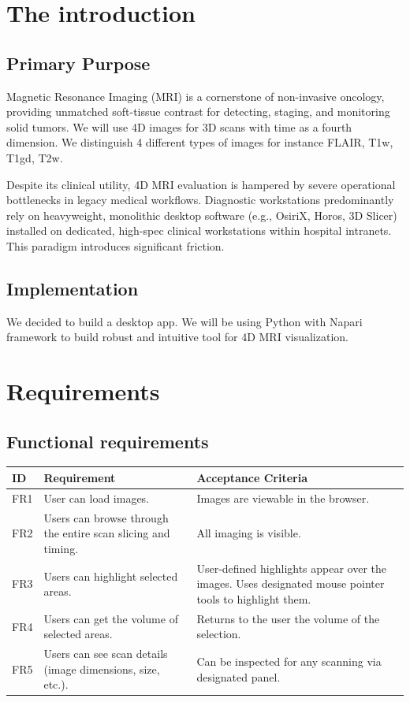 \documentclass[11pt, a4paper]{article}
\begin{document}
\section{The introduction}

\subsection{Primary Purpose}

Magnetic Resonance Imaging (MRI) is a cornerstone of non-invasive oncology, providing unmatched soft-tissue contrast for detecting, staging, and monitoring solid tumors. We will use 4D images for 3D scans with time as a fourth dimension. We distinguish 4 different types of images for instance FLAIR, T1w, T1gd, T2w.

Despite its clinical utility, 4D MRI evaluation is hampered by severe operational bottlenecks in legacy medical workflows. Diagnostic workstations predominantly rely on heavyweight, monolithic desktop software (e.g., OsiriX, Horos, 3D Slicer) installed on dedicated, high-spec clinical workstations within hospital intranets. This paradigm introduces significant friction.

\subsection{Implementation}

We decided to build a desktop app. We will be using Python with Napari framework to build robust and intuitive tool for 4D MRI visualization.

\section{Requirements}

\subsection{Functional requirements}

\begin{tabularx}{\textwidth}{|l|X|X|}
\hline
ID  & Requirement                                                   & Acceptance Criteria \\ \hline
FR1 & User can load images.                                         & Images are viewable in the browser. \\ \hline
FR2 & Users can browse through the entire scan slicing and timing.  & All imaging is visible. \\ \hline
FR3 & Users can highlight selected areas.                           & User-defined highlights appear over the images. Uses designated mouse pointer tools to highlight them. \\ \hline
FR4 & Users can get the volume of selected areas.                   & Returns to the user the volume of the selection. \\ \hline
FR5 & Users can see scan details (image dimensions, size, etc.).    & Can be inspected for any scanning via designated panel. \\ \hline
\end{tabularx}
\end{document}
